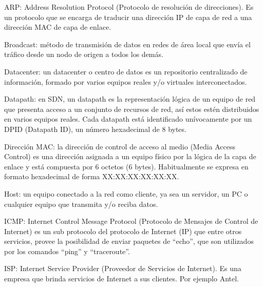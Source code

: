 \documentclass[12pt,a4paper,oneside]{book}
\begin{document}
\vspace{0,5cm}

ARP: Address Resolution Protocol (Protocolo de resolución de direcciones). Es un protocolo que se encarga de traducir una dirección IP de capa de red a una dirección MAC de capa de enlace.

\vspace{0,5cm}

Broadcast: 
método de transmisión de datos en redes de área local que envía el tráfico desde un nodo de origen a todos los demás.

\vspace{0,5cm}

Datacenter: 
un datacenter o centro de datos es un repositorio centralizado de información, formado por varios equipos reales y/o virtuales interconectados.

\vspace{0,5cm}

Datapath: en SDN, un datapath es la representación lógica de un equipo de red que presenta acceso a un conjunto de recursos de red, así estos estén distribuidos en varios equipos reales. Cada datapath está identificado unívocamente por un DPID (Datapath ID), un número hexadecimal de 8 bytes.

\vspace{0,5cm}

Dirección MAC: la dirección de control de acceso al medio (Media Access Control) es una dirección asignada a un equipo físico por la lógica de la capa de enlace y está compuesta por 6 octetos (6 bytes). Habitualmente se expresa en formato hexadecimal de forma XX:XX:XX:XX:XX:XX.

\vspace{0,5cm}

Host: un equipo conectado a la red como cliente, ya sea un servidor, un PC o cualquier equipo que transmita y/o reciba datos.

\vspace{0,5cm}

ICMP: Internet Control Message Protocol (Protocolo de Mensajes de Control de Internet) es un sub protocolo del protocolo de Internet (IP) que entre otros servicios, provee la posibilidad de enviar paquetes de “echo”, que son utilizados por los comandos “ping” y “traceroute”.

\vspace{0,5cm}

ISP: Internet Service Provider (Proveedor de Servicios de Internet). Es una empresa que brinda servicios de Internet a sus clientes. Por ejemplo Antel.
\end{document}
